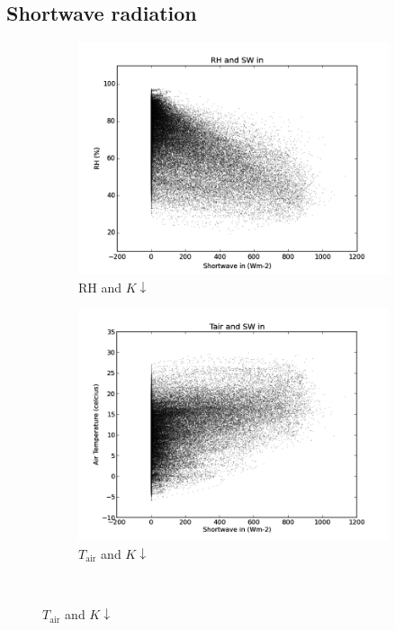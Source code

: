 \documentclass[a4paper,titlepage, twoside]{report}
\newcommand\Kdown{K\!\!\downarrow}
\begin{document}
\subsection{Shortwave radiation}
\begin{figure}
\centering
\begin{subfigure}{0.48\textwidth}
\includegraphics[width=\textwidth]{008_SW_RH.png}
\caption{$\mathrm{RH}$ and $\Kdown$}
\end{subfigure}
\hfill
\begin{subfigure}{0.48\textwidth}
\includegraphics[width=\textwidth]{009_SW_Tair.png}
\caption{$T_\mathrm{air}$ and $\Kdown$}
\end{subfigure}
\\

\end{figure}
\end{document}
